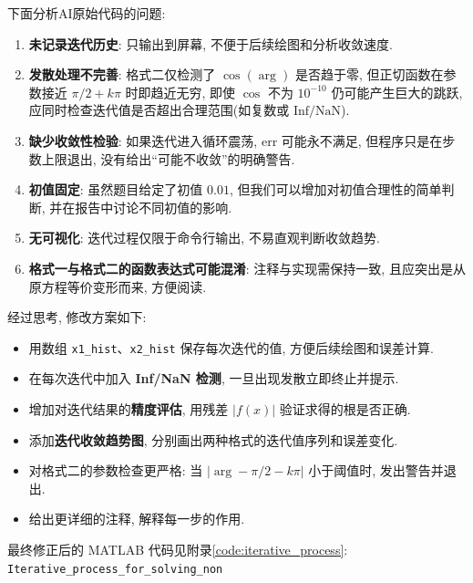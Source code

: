 \documentclass[12pt,a4paper]{ctexart}
\begin{document}
下面分析AI原始代码的问题: 
\begin{enumerate}
    \item \textbf{未记录迭代历史}: 只输出到屏幕, 不便于后续绘图和分析收敛速度. 
    
    \item \textbf{发散处理不完善}: 格式二仅检测了 $\cos(\arg)$ 是否趋于零, 但正切函数在参数接近 $\pi/2 + k\pi$ 时即趋近无穷, 即使 $\cos$ 不为 $10^{-10}$ 仍可能产生巨大的跳跃, 应同时检查迭代值是否超出合理范围(如复数或 $\mathrm{Inf}/\mathrm{NaN}$). 
    
    \item \textbf{缺少收敛性检验}: 如果迭代进入循环震荡, $\mathrm{err}$ 可能永不满足, 但程序只是在步数上限退出, 没有给出“可能不收敛”的明确警告. 
    
    \item \textbf{初值固定}: 虽然题目给定了初值 $0.01$, 但我们可以增加对初值合理性的简单判断, 并在报告中讨论不同初值的影响. 
    
    \item \textbf{无可视化}: 迭代过程仅限于命令行输出, 不易直观判断收敛趋势. 
    
    \item \textbf{格式一与格式二的函数表达式可能混淆}: 注释与实现需保持一致, 且应突出是从原方程等价变形而来, 方便阅读. 
\end{enumerate}
经过思考, 修改方案如下:
\begin{itemize}
    \item 用数组 \texttt{x1\_hist}、\texttt{x2\_hist} 保存每次迭代的值, 方便后续绘图和误差计算. 
    
    \item 在每次迭代中加入 \textbf{Inf/NaN 检测}, 一旦出现发散立即终止并提示. 
    
    \item 增加对迭代结果的\textbf{精度评估}, 用残差 $|f(x)|$ 验证求得的根是否正确. 
    
    \item 添加\textbf{迭代收敛趋势图}, 分别画出两种格式的迭代值序列和误差变化. 
    
    \item 对格式二的参数检查更严格: 当 $|\arg - \pi/2 - k\pi|$ 小于阈值时, 发出警告并退出. 
    
    \item 给出更详细的注释, 解释每一步的作用. 
\end{itemize}

最终修正后的 MATLAB 代码见附录\ref{code:iterative_process}: \texttt{Iterative\_process\_for\_solving\_non}
\end{document}
